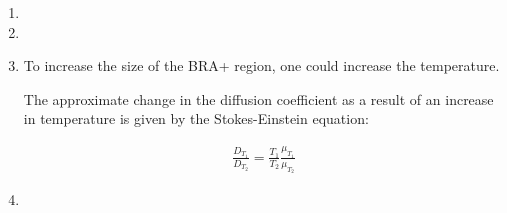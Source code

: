 \documentclass{article} %
\begin{document}
\begin{enumerate}
        Steady state solution for BMPR2:
        
        \begin{align*}
            0 &= \alpha L_0 e^{\frac{-x}{\lambda}} L-k_r R \\
            &=\SI{5e-3}{\n\g\per\s\per\micro\m}e^{\frac{-x}{\SI{149}{\micro\m}}} - \SI{10^-3}{\per\s}R

        \end{align*}
        
        
    \item
    \item 
    \item To increase the size of the BRA+ region, one could increase the temperature.
    
    The approximate change in the diffusion coefficient as a result of an increase in temperature is given by the Stokes-Einstein equation:
    
    \begin{align*}
        \frac{D_{T_1}}{D_{T_2}}=\frac{T_1}{T_2} \frac{\mu_{T_1}}{\mu_{T_2}}
    \end{align*}
    \item 
\end{enumerate}
\end{document}
